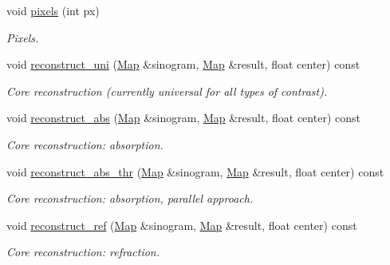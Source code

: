\begin{DoxyCompactItemize}
\item 
void \hyperlink{classCTrec_a3fe0212cf11d705168bb9c9701d8c818}{pixels} (int px)
\begin{DoxyCompactList}\small\item\em Pixels. \item\end{DoxyCompactList}\item 
void \hyperlink{classCTrec_a8da831c3e57bc8925b67155aa9dc06d7}{reconstruct\_\-uni} (\hyperlink{group__Types_ga8747378c016fc11d9ecbb98787248c25}{Map} \&sinogram, \hyperlink{group__Types_ga8747378c016fc11d9ecbb98787248c25}{Map} \&result, float center) const 
\begin{DoxyCompactList}\small\item\em Core reconstruction (currently universal for all types of contrast). \item\end{DoxyCompactList}\item 
void \hyperlink{classCTrec_a3bb57574704cba563bd6ed4b744744de}{reconstruct\_\-abs} (\hyperlink{group__Types_ga8747378c016fc11d9ecbb98787248c25}{Map} \&sinogram, \hyperlink{group__Types_ga8747378c016fc11d9ecbb98787248c25}{Map} \&result, float center) const 
\begin{DoxyCompactList}\small\item\em Core reconstruction: absorption. \item\end{DoxyCompactList}\item 
void \hyperlink{classCTrec_a0d8046125f82d2ccd559cb026b623d7a}{reconstruct\_\-abs\_\-thr} (\hyperlink{group__Types_ga8747378c016fc11d9ecbb98787248c25}{Map} \&sinogram, \hyperlink{group__Types_ga8747378c016fc11d9ecbb98787248c25}{Map} \&result, float center) const 
\begin{DoxyCompactList}\small\item\em Core reconstruction: absorption, parallel approach. \item\end{DoxyCompactList}\item 
void \hyperlink{classCTrec_a17eddd671efd6189fd07b541adc4a6ab}{reconstruct\_\-ref} (\hyperlink{group__Types_ga8747378c016fc11d9ecbb98787248c25}{Map} \&sinogram, \hyperlink{group__Types_ga8747378c016fc11d9ecbb98787248c25}{Map} \&result, float center) const 
\begin{DoxyCompactList}\small\item\em Core reconstruction: refraction. \item\end{DoxyCompactList}\item 

\end{DoxyCompactItemize}

